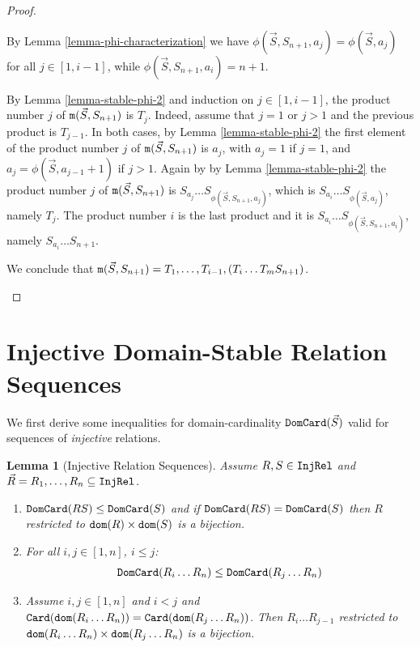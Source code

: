\documentclass{lmcs}
\newtheorem{lemma}[theorem]{Lemma}
\begin{document}
\begin{proof}
\begin{enumerate}
\begin{enumerate}
By Lemma \ref{lemma-phi-characterization} we have 
$\phi(\vec{S},S_{n+1},a_j) = \phi(\vec{S},a_j)$ for all $j \in [1,i-1]$, while 
$\phi(\vec{S},S_{n+1},a_i) = n+1$. 

By Lemma \ref{lemma-stable-phi-2} and induction on $j \in [1,i-1]$,
the product number $j$ of ${\tt m}(\vec{S},S_{n+1})$ is $T_j$.
Indeed, assume that $j=1$ or $j>1$ and the previous product is $T_{j-1}$.
In both cases, by Lemma \ref{lemma-stable-phi-2} the first element
of the product number $j$ of ${\tt m}(\vec{S},S_{n+1})$
is $a_j$, with $a_j = 1$ if $j=1$, and $a_j = \phi(\vec{S},a_ {j-1}+1)$ if $j>1$. 
Again by by Lemma \ref{lemma-stable-phi-2} the product number $j$ 
of ${\tt m}(\vec{S},S_{n+1})$ is $S_{a_j} \ldots S_{\phi(\vec{S},S_{n+1},a_j)}$, 
which is $S_{a_i} \ldots S_{\phi(\vec{S},a_j)}$, namely $T_j$.
The product number $i$ is the last product and it is  
$S_{a_i} \ldots S_{\phi(\vec{S},S_{n+1},a_i)}$,
namely $S_{a_i} \ldots S_{n+1}$.

We conclude that 
${\tt m}(\vec{S}, S_{n+1}) = T_1, \ldots, T_{i-1}, (T_i \ldots T_m S_{n+1})$.
\end{enumerate}
\end{enumerate}
\end{proof}


\section{Injective Domain-Stable Relation Sequences}

We first derive some inequalities for domain-cardinality ${\tt DomCard}(\vec{S})$
valid for sequences of \emph{injective} relations.

\begin{lemma}[Injective Relation Sequences]
\label{lemma-injective-sequences}
Assume $R, S \in {\tt InjRel}$ and $\vec{R}=R_1, \ldots, R_n \subseteq {\tt InjRel}$.

\begin{enumerate}
\item
\label{lemma-injective-sequences-01}
${\tt DomCard}(RS) \le {\tt DomCard}(S)$
and if ${\tt DomCard}(RS) = {\tt DomCard}(S)$ then $R$ restricted to ${\tt dom}(R) \times {\tt dom}(S)$
is a bijection.

\item
\label{lemma-injective-sequences-02}
For all $i,j \in [1,n]$, $i \le j$:
$$
{\tt DomCard}(R_i \ldots R_n) \le {\tt DomCard}(R_j \ldots R_n)
$$

\item
\label{lemma-injective-sequences-03}
Assume $i, j \in[1,n]$ and $i < j$ and 
${\tt Card}({\tt dom}(R_i \ldots R_n)) = {\tt Card}({\tt dom}(R_j \ldots R_n))$.
Then $R_i \ldots R_{j-1}$ restricted to ${\tt dom}(R_i \ldots R_n) \times {\tt dom}(R_j \ldots R_n)$
is a bijection.
\end{enumerate}
\end{lemma}
\end{document}
